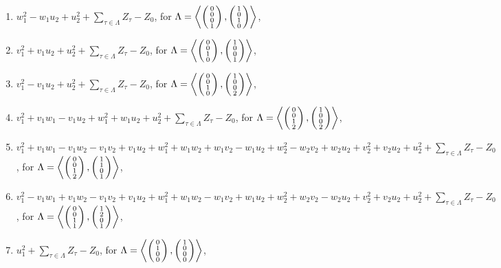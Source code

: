 \begin{prop}
\begin{enumerate}
\item
$w_1^2-w_1u_2+u_2^2+\sum_{\tau\in \Lambda} Z_\tau-Z_0$, for $\Lambda= \plan{0\\0\\0\\1}{1\\0\\1\\0}$,
\item
$v_1^2+v_1u_2+u_2^2+\sum_{\tau\in \Lambda} Z_\tau-Z_0$, for $\Lambda= \plan{0\\0\\1\\0}{1\\0\\0\\1}$,
\item
$v_1^2-v_1u_2+u_2^2+\sum_{\tau\in \Lambda} Z_\tau-Z_0$, for $\Lambda= \plan{0\\0\\1\\0}{1\\0\\0\\2}$,
\item
$v_1^2+v_1w_1-v_1u_2+w_1^2+w_1u_2+u_2^2+\sum_{\tau\in \Lambda} Z_\tau-Z_0$, for $\Lambda = \plan{0\\0\\1\\2}{1\\0\\0\\2}$,
\item
$v_1^2+v_1w_1-v_1w_2-v_1v_2+v_1u_2+w_1^2+w_1w_2+w_1v_2-w_1u_2+w_2^2-w_2v_2+w_2u_2+v_2^2+v_2u_2+u_2^2+\sum_{\tau\in \Lambda} Z_\tau-Z_0$, for $\Lambda = \plan{0\\0\\1\\2}{1\\1\\0\\1}$,
\item
$v_1^2-v_1w_1+v_1w_2-v_1v_2+v_1u_2+w_1^2+w_1w_2-w_1v_2+w_1u_2+w_2^2+w_2v_2-w_2u_2+v_2^2+v_2u_2+u_2^2+\sum_{\tau\in \Lambda} Z_\tau-Z_0$, for $\Lambda = \plan{0\\0\\1\\1}{1\\2\\0\\1}$,
\item
$u_1^2+\sum_{\tau\in \Lambda} Z_\tau-Z_0$, for  $\Lambda = \plan{0\\1\\0\\0}{1\\0\\0\\0}$,

\end{enumerate}
\end{prop}
